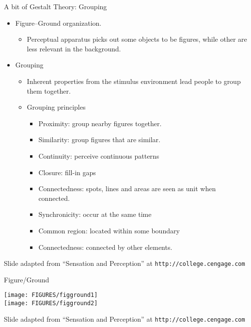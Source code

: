 \documentclass[9pt]{beamer}
\begin{document}
\begin{frame}[t]{A bit of Gestalt Theory: Grouping}
  \begin{itemize}
  \item Figure--Ground organization.
    \begin{itemize}
    \item Perceptual apparatus picks out some objects to be figures, while other are less relevant in the background.
    \end{itemize}
  \item Grouping
    \begin{itemize}
    \item Inherent properties from the stimulus environment lead people to group them together.
    \item Grouping principles
      \begin{itemize}
      \item Proximity: group nearby figures together.
      \item Similarity: group figures that are similar.
      \item Continuity: perceive continuous patterns
      \item Closure: fill-in gaps
      \item Connectedness: spots, lines and areas are seen as unit when connected. 
      \item Synchronicity: occur at the same time
      \item Common region: located within some boundary
      \item Connectedness: connected by other elements.
      \end{itemize}
    \end{itemize}
  \end{itemize}
  \vfill
  {\fontsize{6}{6}\selectfont Slide adapted from ``Sensation and Perception'' at \texttt{http://college.cengage.com}}
\end{frame}


\begin{frame}[t]{Figure/Ground}
  \begin{center}
    \texttt{[image: FIGURES/figground1]}\\
    \texttt{[image: FIGURES/figground2]}\\
  \end{center}
  \vfill
  {\fontsize{6}{6}\selectfont Slide adapted from ``Sensation and Perception'' at \texttt{http://college.cengage.com}}
\end{frame}
\end{document}
